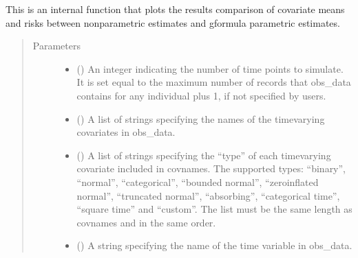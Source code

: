\documentclass[letterpaper,10pt,english]{sphinxmanual}
\begin{document}
\begin{fulllineitems}
\label{\detokenize{Specifications/Output:pygformula.plot.plot_natural_course}}
\sphinxAtStartPar
This is an internal function that plots the results comparison of covariate means and risks between non\sphinxhyphen{}parametric
estimates and g\sphinxhyphen{}formula parametric estimates.
\begin{quote}\begin{description}
\item[{Parameters}] \leavevmode\begin{itemize}
\item {} 
\sphinxAtStartPar
{} () \textendash{} An integer indicating the number of time points to simulate. It is set equal to the maximum number of records
that obs\_data contains for any individual plus 1, if not specified by users.

\item {} 
\sphinxAtStartPar
{} () \textendash{} A list of strings specifying the names of the time\sphinxhyphen{}varying covariates in obs\_data.

\item {} 
\sphinxAtStartPar
{} () \textendash{} A list of strings specifying the “type” of each time\sphinxhyphen{}varying covariate included in covnames.
The supported types: “binary”, “normal”, “categorical”, “bounded normal”, “zero\sphinxhyphen{}inflated normal”,
“truncated normal”, “absorbing”, “categorical time”, “square time” and “custom”. The list must be the same length
as covnames and in the same order.

\item {} 
\sphinxAtStartPar
{} () \textendash{} A string specifying the name of the time variable in obs\_data.


\end{itemize}
\end{description}
\end{quote}
\end{fulllineitems}
\end{document}
